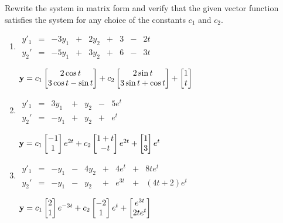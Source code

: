 \documentclass{ximera}
\begin{document}
\begin{problem}\label{exer:10.2.5}
Rewrite the system in matrix form and
 verify that the given vector function satisfies the  system for
any choice of the constants $c_1$ and $c_2$.

\begin{enumerate}
\item %
 $\begin{array}{ccccccccc}
 y'_1&=&-3y_1&+&2y_2&+&3&-&2t \\
y_2'&=&-5y_1&+&3y_2&+&6&-&3t\end{array}$

${\bf y}=c_1\begin{bmatrix}2\cos t\\3\cos t-\sin
t\end{bmatrix}+c_2\begin{bmatrix}2\sin t\\3\sin t+\cos t
\end{bmatrix}+\begin{bmatrix}1\\t\end{bmatrix}$

\item %
 $\begin{array}{ccccccc}
 y'_1&=&3y_1&+&y_2&-&5e^t \\
y_2'&=&-y_1&+&y_2&+&e^t\end{array}$

${\bf
y}=c_1\begin{bmatrix}-1\\1\end{bmatrix}e^{2t}+c_2\begin{bmatrix}1+t\\-t\end{bmatrix}e^{2t}+\begin{bmatrix}1\\3\end{bmatrix}e^t$

\item %
 $\begin{array}{ccccccccc}
 y'_1&=&-y_1&-&4y_2&+&4e^t&+&8te^t \\
y_2'&=&-y_1&-&y_2&+&e^{3t}&+&(4t+2)e^t\end{array}$

${\bf y}=c_1\begin{bmatrix}2\\1\end{bmatrix}e^{-3t}+c_2\begin{bmatrix}-2\\1\end{bmatrix}e^t+\begin{bmatrix}
e^{3t}\\2te^t\end{bmatrix}$


\end{enumerate}
\end{problem}
\end{document}
